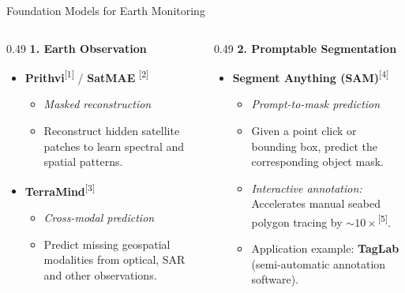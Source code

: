\documentclass[aspectratio=169,10pt]{beamer}
\begin{document}
\begin{frame}[t]{Foundation Models for Earth Monitoring}
\small

\begin{columns}[T,onlytextwidth]

\begin{column}{0.49\textwidth}
  \textbf{1. Earth Observation}

  \vspace{0.05cm}
  \begin{itemize}
    \setlength{\itemsep}{0.08cm}

    \item \textbf{Prithvi}\textsuperscript{\color{OceanTeal}[1]} / \textbf{SatMAE} \textsuperscript{\color{OceanTeal}[2]}
    \begin{itemize}
      \item \textit{Masked reconstruction}
      \item Reconstruct hidden satellite patches
      to learn spectral and spatial patterns.
    \end{itemize}

    \item \textbf{TerraMind}\textsuperscript{\color{OceanTeal}[3]}
    \begin{itemize}
      \item \textit{Cross-modal prediction}
      \item Predict missing geospatial modalities
      from optical, SAR and other observations.
    \end{itemize}
  \end{itemize}
\end{column}

\begin{column}{0.49\textwidth}
  \textbf{2. Promptable Segmentation}

  \vspace{0.05cm}
  \begin{itemize}
    \setlength{\itemsep}{0.08cm}

    \item \textbf{Segment Anything (SAM)}\textsuperscript{\color{OceanTeal}[4]}
    \begin{itemize}
      \item \textit{Prompt-to-mask prediction}
      \item Given a point click or bounding box,
      predict the corresponding object mask.
      \item \textit{Interactive annotation:} Accelerates manual seabed polygon tracing by $\sim 10\times$\textsuperscript{\color{OceanTeal}[5]}.
      \item Application example: \textbf{TagLab} (semi-automatic annotation software).
    \end{itemize}
  \end{itemize}
\end{column}


\end{columns}
\end{frame}
\end{document}
